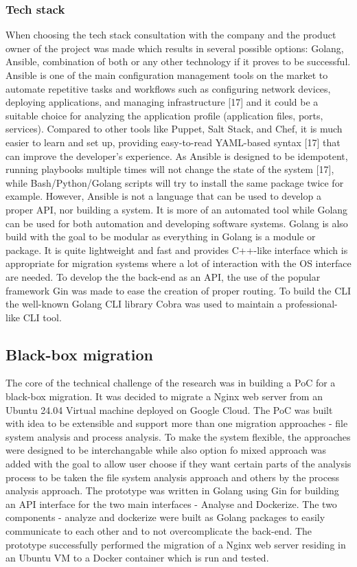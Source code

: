 \documentclass{article}
\begin{document}
\begin{multicols}{2}
\subsubsection{Tech stack}
When choosing the tech stack consultation with the company and the product owner of the project was made which results in several possible options: Golang, Ansible, combination of both or any other technology if it proves to be successful. Ansible is one of the main configuration management tools on the market to automate repetitive tasks and workflows such as configuring network devices, deploying applications, and managing infrastructure [17] and it could be a suitable choice for analyzing the application profile (application files, ports, services). Compared to other tools like Puppet, Salt Stack, and Chef, it is much easier to learn and set up, providing easy-to-read YAML-based syntax [17] that can improve the developer’s experience. As Ansible is designed to be idempotent, running playbooks multiple times will not change the state of the system [17], while Bash/Python/Golang scripts will try to install the same package twice for example. However, Ansible is not a language that can be used to develop a proper API, nor building a system. It is more of an automated tool while Golang can be used for both automation and developing software systems. Golang is also build with the goal to be modular as everything in Golang is a module or package. It is quite lightweight and fast and provides C++-like interface which is appropriate for migration systems where a lot of interaction with the OS interface are needed. To develop the the back-end as an API, the use of the popular framework Gin was made to ease the creation of proper routing. To build the CLI the well-known Golang CLI library Cobra was used to maintain a professional-like CLI tool.

\subsection{Black-box migration}
The core of the technical challenge of the research was in building a PoC for a black-box migration. It was decided to migrate a Nginx web server from an Ubuntu 24.04 Virtual machine deployed on Google Cloud. The PoC was built with idea to be extensible and support more than one migration approaches - file system analysis and process analysis. To make the system flexible, the approaches were designed to be interchangable while also option fo mixed approach was added with the goal to allow user choose if they want certain parts of the analysis process to be taken the file system analysis approach and others by the process analysis approach. The prototype was written in Golang using Gin for building an API interface for the two main interfaces - Analyse and Dockerize. The two components - analyze and dockerize were built as Golang packages to easily communicate to each other and to not overcomplicate the back-end. The prototype successfully performed the migration of a Nginx web server residing in an Ubuntu VM to a Docker container which is run and tested.


\end{multicols}
\end{document}
